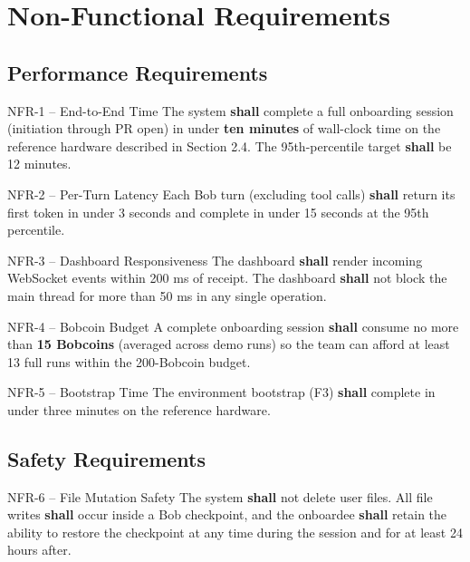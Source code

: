 \documentclass[11pt,letterpaper]{article}
\newcommand{\shall}{\textbf{shall}}
\begin{document}
\section{Non-Functional Requirements}

\subsection{Performance Requirements}

\begin{reqbox}{NFR-1 -- End-to-End Time}
The system \shall{} complete a full onboarding session (initiation through PR open) in under \textbf{ten minutes} of wall-clock time on the reference hardware described in Section 2.4. The 95th-percentile target \shall{} be 12 minutes.
\end{reqbox}

\begin{reqbox}{NFR-2 -- Per-Turn Latency}
Each Bob turn (excluding tool calls) \shall{} return its first token in under 3 seconds and complete in under 15 seconds at the 95th percentile.
\end{reqbox}

\begin{reqbox}{NFR-3 -- Dashboard Responsiveness}
The dashboard \shall{} render incoming WebSocket events within 200 ms of receipt. The dashboard \shall{} not block the main thread for more than 50 ms in any single operation.
\end{reqbox}

\begin{reqbox}{NFR-4 -- Bobcoin Budget}
A complete onboarding session \shall{} consume no more than \textbf{15 Bobcoins} (averaged across demo runs) so the team can afford at least 13 full runs within the 200-Bobcoin budget.
\end{reqbox}

\begin{reqbox}{NFR-5 -- Bootstrap Time}
The environment bootstrap (F3) \shall{} complete in under three minutes on the reference hardware.
\end{reqbox}

\subsection{Safety Requirements}

\begin{reqbox}{NFR-6 -- File Mutation Safety}
The system \shall{} not delete user files. All file writes \shall{} occur inside a Bob checkpoint, and the onboardee \shall{} retain the ability to restore the checkpoint at any time during the session and for at least 24 hours after.
\end{reqbox}
\end{document}
